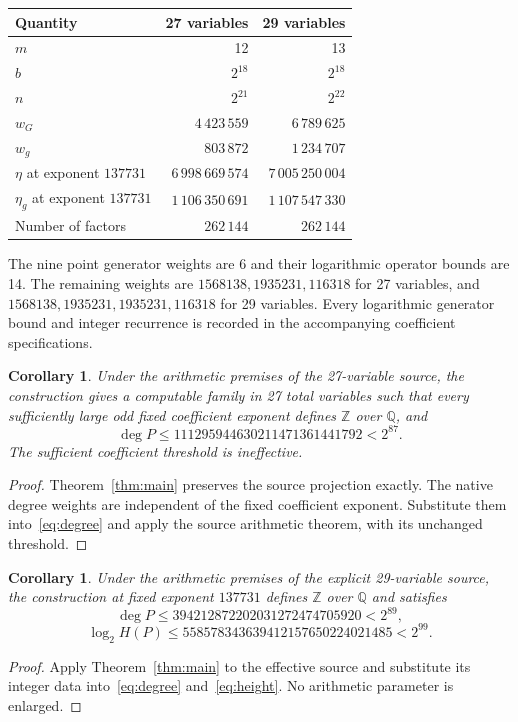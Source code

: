 \documentclass[11pt,a4paper]{article}
\newtheorem{corollary}[theorem]{Corollary}
\newcommand{\Q}{\mathbb Q}\newcommand{\Z}{\mathbb Z}
\begin{document}
\begin{center}
\begin{tabular}{lrr}
\toprule
Quantity & 27 variables & 29 variables\\
\midrule
$m$ & 12 & 13\\
$b$ & $2^{18}$ & $2^{18}$\\
$n$ & $2^{21}$ & $2^{22}$\\
$w_G$ & $4\,423\,559$ & $6\,789\,625$\\
$w_g$ & $803\,872$ & $1\,234\,707$\\
$\eta$ at exponent $137731$ & $6\,998\,669\,574$ & $7\,005\,250\,004$\\
$\eta_g$ at exponent $137731$ & $1\,106\,350\,691$ & $1\,107\,547\,330$\\
Number of factors & $262\,144$ & $262\,144$\\
\bottomrule
\end{tabular}
\end{center}
The nine point generator weights are 6 and their logarithmic
operator bounds are 14. The remaining weights are
$1568138,1935231,116318$ for 27 variables, and
$1568138,1935231,1935231,116318$ for 29 variables.
Every logarithmic generator bound and integer recurrence is
recorded in the accompanying coefficient specifications.

\begin{corollary}\label{cor:27}
Under the arithmetic premises of the 27-variable source,
the construction gives a computable family in 27 total variables
such that every sufficiently large odd fixed coefficient exponent
defines $\Z$ over $\Q$, and
\[
 \deg P\le111295944630211471361441792<2^{87}.
\]
The sufficient coefficient threshold is ineffective.
\end{corollary}
\begin{proof}
Theorem~\ref{thm:main} preserves the source projection exactly.
The native degree weights are independent of the fixed coefficient
exponent. Substitute them into~\eqref{eq:degree} and apply the
source arithmetic theorem, with its unchanged threshold.
\end{proof}

\begin{corollary}\label{cor:29}
Under the arithmetic premises of the explicit 29-variable source,
the construction at fixed exponent $137731$ defines $\Z$ over
$\Q$ and satisfies
\[
 \deg P\le394212872202031272474705920<2^{89},
\]
\[
 \log_2 H(P)\le558578343639412157650224021485<2^{99}.
\]
\end{corollary}
\begin{proof}
Apply Theorem~\ref{thm:main} to the effective source and substitute
its integer data into~\eqref{eq:degree} and~\eqref{eq:height}.
No arithmetic parameter is enlarged.
\end{proof}
\end{document}
